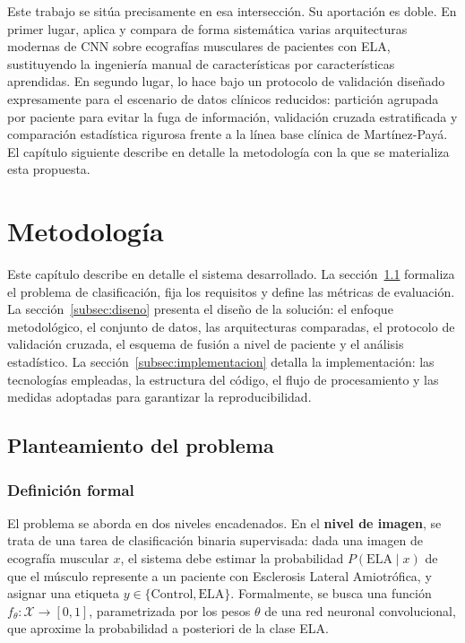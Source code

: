 \documentclass[12pt]{extarticle}
\numberwithin{equation}{section}
\begin{document}
\begin{refsection}
Este trabajo se sitúa precisamente en esa intersección. Su aportación es doble. En primer lugar, aplica y compara de forma sistemática varias arquitecturas modernas de CNN sobre ecografías musculares de pacientes con ELA, sustituyendo la ingeniería manual de características por características aprendidas. En segundo lugar, lo hace bajo un protocolo de validación diseñado expresamente para el escenario de datos clínicos reducidos: partición agrupada por paciente para evitar la fuga de información, validación cruzada estratificada y comparación estadística rigurosa frente a la línea base clínica de Martínez-Payá. El capítulo siguiente describe en detalle la metodología con la que se materializa esta propuesta.

\newpage


\section{Metodolog\'ia}\label{sec:methodology}

Este capítulo describe en detalle el sistema desarrollado. La sección~\ref{subsec:planteamiento} formaliza el problema de clasificación, fija los requisitos y define las métricas de evaluación. La sección~\ref{subsec:diseno} presenta el diseño de la solución: el enfoque metodológico, el conjunto de datos, las arquitecturas comparadas, el protocolo de validación cruzada, el esquema de fusión a nivel de paciente y el análisis estadístico. La sección~\ref{subsec:implementacion} detalla la implementación: las tecnologías empleadas, la estructura del código, el flujo de procesamiento y las medidas adoptadas para garantizar la reproducibilidad.

\subsection{Planteamiento del problema}\label{subsec:planteamiento}

\subsubsection{Definición formal}

El problema se aborda en dos niveles encadenados. En el \textbf{nivel de imagen}, se trata de una tarea de clasificación binaria supervisada: dada una imagen de ecografía muscular $x$, el sistema debe estimar la probabilidad $P(\text{ELA}\mid x)$ de que el músculo represente a un paciente con Esclerosis Lateral Amiotrófica, y asignar una etiqueta $y \in \{\text{Control}, \text{ELA}\}$. Formalmente, se busca una función $f_\theta: \mathcal{X} \rightarrow [0,1]$, parametrizada por los pesos $\theta$ de una red neuronal convolucional, que aproxime la probabilidad a posteriori de la clase ELA.


\end{refsection}
\end{document}
